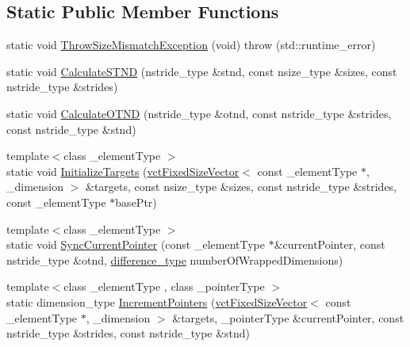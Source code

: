 \subsection*{Static Public Member Functions}
\begin{DoxyCompactItemize}
\item 
static void \hyperlink{classvct_dynamic_n_array_loop_engines_a785abf22d2322be74fdb0b8b834c44cd}{Throw\+Size\+Mismatch\+Exception} (void)  throw (std\+::runtime\+\_\+error)
\item 
static void \hyperlink{classvct_dynamic_n_array_loop_engines_ae88b8397b6859672d54c8caf720d1fab}{Calculate\+S\+T\+N\+D} (nstride\+\_\+type \&stnd, const nsize\+\_\+type \&sizes, const nstride\+\_\+type \&strides)
\item 
static void \hyperlink{classvct_dynamic_n_array_loop_engines_a6d983fd04968226618130831bcf39876}{Calculate\+O\+T\+N\+D} (nstride\+\_\+type \&otnd, const nstride\+\_\+type \&strides, const nstride\+\_\+type \&stnd)
\item 
{\footnotesize template$<$class \+\_\+element\+Type $>$ }\\static void \hyperlink{classvct_dynamic_n_array_loop_engines_a20664a56f6678bcad4f546aa0655f513}{Initialize\+Targets} (\hyperlink{classvct_fixed_size_vector}{vct\+Fixed\+Size\+Vector}$<$ const \+\_\+element\+Type $\ast$, \+\_\+dimension $>$ \&targets, const nsize\+\_\+type \&sizes, const nstride\+\_\+type \&strides, const \+\_\+element\+Type $\ast$base\+Ptr)
\item 
{\footnotesize template$<$class \+\_\+element\+Type $>$ }\\static void \hyperlink{classvct_dynamic_n_array_loop_engines_a0b6398ab903f658134e9f606bda183cf}{Sync\+Current\+Pointer} (const \+\_\+element\+Type $\ast$\&current\+Pointer, const nstride\+\_\+type \&otnd, \hyperlink{classvct_dynamic_n_array_loop_engines_ae8d37731d603321cd52e0a6a6d13a017}{difference\+\_\+type} number\+Of\+Wrapped\+Dimensions)
\item 
{\footnotesize template$<$class \+\_\+element\+Type , class \+\_\+pointer\+Type $>$ }\\static dimension\+\_\+type \hyperlink{classvct_dynamic_n_array_loop_engines_a885fbc2237c49073b2c2c7d8de3a25ba}{Increment\+Pointers} (\hyperlink{classvct_fixed_size_vector}{vct\+Fixed\+Size\+Vector}$<$ const \+\_\+element\+Type $\ast$, \+\_\+dimension $>$ \&targets, \+\_\+pointer\+Type \&current\+Pointer, const nstride\+\_\+type \&strides, const nstride\+\_\+type \&stnd)
\end{DoxyCompactItemize}


